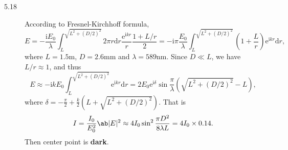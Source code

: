 \documentclass[11pt, twoside]{article}   	%
\theoremstyle{plain}
\theoremstyle{definition}
\begin{document}
\begin{description}
		\item[5.18] According to Fresnel-Kirchhoff formula,
			\begin{equation}
				E = -\frac{\mathrm{i}E_0}{\lambda} \int_L^{\sqrt{L^2 + (D/2)^2}}2\pi r \mathrm{d} r
				\frac{
				\mathrm e^{\mathrm{i} k r}}{r} \frac{1 + L/r}{2} = -\mathrm{i}\pi \frac{E_0}{\lambda}
				\int_L^{\sqrt{L^2 + (D/2)^2}} \left( 1 + \frac{L}{r} \right) \mathrm e^{\mathrm{i}
				k r} \mathrm{d} r,
			\end{equation}
			where $L = 1.5 \mathrm{m}$, $D = 2.6 \mathrm{mm}$ and $\lambda = 589 \mathrm{nm}$. Since
			$D \ll L$, we have $L/r \approx 1$, and thus
			\begin{equation}
				E \approx -\mathrm{i}k E_0 \int_L^{\sqrt{L^2 + (D/2)^2}}
				\mathrm e^{\mathrm{i} k r} \mathrm{d} r = 2 E_0 \mathrm e^{\mathrm{i} \delta} \sin
				\frac{\pi}{\lambda} \left( \sqrt{L^2 + (D/2)^2} - L \right),
			\end{equation}
			where $\delta = -\frac{\pi}{2} + \frac{k}{2} \left( L + \sqrt{L^2 + (D/2)^2} \right)$.
			That is
			\begin{equation}
				I = \frac{I_0}{E_0^2} \ab|E|^2 \approx 4 I_0 \sin^2 \frac{\pi D^2}{8\lambda L}
				= 4 I_0 \times 0.14.
			\end{equation}
			Then center point is \textbf{dark}.


\end{description}
\end{document}
